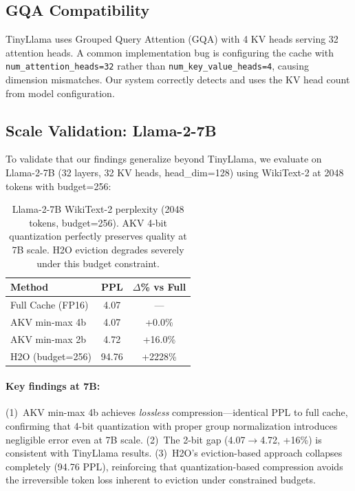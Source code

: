 \documentclass[11pt,a4paper]{article}
\begin{document}
\subsection{GQA Compatibility}

TinyLlama uses Grouped Query Attention (GQA) with 4 KV heads serving 32 attention heads. A common implementation bug is configuring the cache with \texttt{num\_attention\_heads=32} rather than \texttt{num\_key\_value\_heads=4}, causing dimension mismatches. Our system correctly detects and uses the KV head count from model configuration.

\subsection{Scale Validation: Llama-2-7B}

To validate that our findings generalize beyond TinyLlama, we evaluate on Llama-2-7B (32 layers, 32 KV heads, head\_dim=128) using WikiText-2 at 2048 tokens with budget=256:

\begin{table}[h]
\centering
\begin{tabular}{lcc}
\toprule
\textbf{Method} & \textbf{PPL} & \textbf{$\Delta$\% vs Full} \\
\midrule
Full Cache (FP16) & 4.07 & --- \\
AKV min-max 4b & 4.07 & +0.0\% \\
AKV min-max 2b & 4.72 & +16.0\% \\
H2O (budget=256) & 94.76 & +2228\% \\
\bottomrule
\end{tabular}
\caption{Llama-2-7B WikiText-2 perplexity (2048 tokens, budget=256). AKV 4-bit quantization perfectly preserves quality at 7B scale. H2O eviction degrades severely under this budget constraint.}
\label{tab:7b_results}
\end{table}

\paragraph{Key findings at 7B:} (1)~AKV min-max 4b achieves \textit{lossless} compression---identical PPL to full cache, confirming that 4-bit quantization with proper group normalization introduces negligible error even at 7B scale. (2)~The 2-bit gap (4.07$\to$4.72, +16\%) is consistent with TinyLlama results. (3)~H2O's eviction-based approach collapses completely (94.76 PPL), reinforcing that quantization-based compression avoids the irreversible token loss inherent to eviction under constrained budgets.
\end{document}
